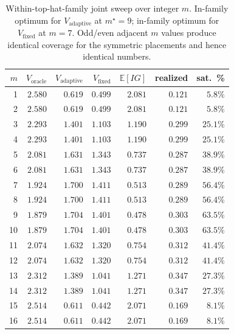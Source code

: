 \documentclass[11pt,a4paper]{article}
\newcommand{\E}{\mathbb{E}}
\begin{document}
\begin{table}[h]
\centering
\caption{Within-top-hat-family joint sweep over integer $m$.  In-family optimum for $V_{\text{adaptive}}$ at $m^\star = 9$; in-family optimum for $V_{\text{fixed}}$ at $m = 7$.  Odd/even adjacent $m$ values produce identical coverage for the symmetric placements and hence identical numbers.}
\label{tab:tophat_sweep}
\small
\begin{tabular}{@{}rrrrrrr@{}}
\toprule
$m$ & $V_{\text{oracle}}$ & $V_{\text{adaptive}}$ & $V_{\text{fixed}}$ & $\E[IG]$ & realized & sat.\ \% \\
\midrule
 1 & $2.580$ & $0.619$          & $0.499$          & $\mathbf{2.081}$ & $0.121$ & $5.8\%$           \\
 2 & $2.580$ & $0.619$          & $0.499$          & $2.081$          & $0.121$ & $5.8\%$           \\
 3 & $2.293$ & $1.401$          & $1.103$          & $1.190$          & $0.299$ & $25.1\%$          \\
 4 & $2.293$ & $1.401$          & $1.103$          & $1.190$          & $0.299$ & $25.1\%$          \\
 5 & $2.081$ & $1.631$          & $1.343$          & $0.737$          & $0.287$ & $38.9\%$          \\
 6 & $2.081$ & $1.631$          & $1.343$          & $0.737$          & $0.287$ & $38.9\%$          \\
 7 & $1.924$ & $1.700$          & $\mathbf{1.411}$ & $0.513$          & $0.289$ & $56.4\%$          \\
 8 & $1.924$ & $1.700$          & $\mathbf{1.411}$ & $0.513$          & $0.289$ & $56.4\%$          \\
 9 & $1.879$ & $\mathbf{1.704}$ & $1.401$          & $0.478$          & $0.303$ & $\mathbf{63.5\%}$ \\
10 & $1.879$ & $\mathbf{1.704}$ & $1.401$          & $0.478$          & $0.303$ & $\mathbf{63.5\%}$ \\
11 & $2.074$ & $1.632$          & $1.320$          & $0.754$          & $0.312$ & $41.4\%$          \\
12 & $2.074$ & $1.632$          & $1.320$          & $0.754$          & $0.312$ & $41.4\%$          \\
13 & $2.312$ & $1.389$          & $1.041$          & $1.271$          & $\mathbf{0.347}$ & $27.3\%$ \\
14 & $2.312$ & $1.389$          & $1.041$          & $1.271$          & $\mathbf{0.347}$ & $27.3\%$ \\
15 & $2.514$ & $0.611$          & $0.442$          & $2.071$          & $0.169$ & $8.1\%$           \\
16 & $2.514$ & $0.611$          & $0.442$          & $2.071$          & $0.169$ & $8.1\%$           \\
\bottomrule
\end{tabular}
\end{table}
\end{document}
